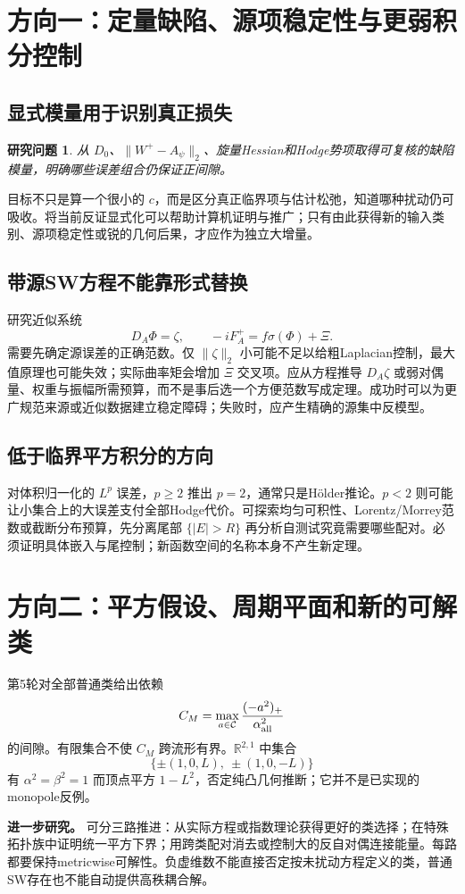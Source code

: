\documentclass[UTF8,fontset=fandol,zihao=-4]{ctexart}
\theoremstyle{research}
\newtheorem{target}[sourceprop]{研究问题}
\newcommand{\R}{\mathbb R}\newcommand{\Z}{\mathbb Z}\newcommand{\CP}{\mathbb{CP}}
\newcommand{\proposal}{\par\noindent\textbf{进一步研究。}}
\begin{document}
\section{方向一：定量缺陷、源项稳定性与更弱积分控制}
\subsection{显式模量用于识别真正损失}
\begin{target}
从 $D_0$、$\|W^+-A_\psi\|_2$、旋量Hessian和Hodge势项取得可复核的缺陷模量，明确哪些误差组合仍保证正间隙。
\end{target}
目标不只是算一个很小的 $c$，而是区分真正临界项与估计松弛，知道哪种扰动仍可吸收。将当前反证显式化可以帮助计算机证明与推广；只有由此获得新的输入类别、源项稳定性或锐的几何后果，才应作为独立大增量。

\subsection{带源SW方程不能靠形式替换}
研究近似系统
\[
 D_A\Phi=\zeta,\qquad -iF_A^+=f\sigma(\Phi)+\Xi.
\]
需要先确定源误差的正确范数。仅 $\|\zeta\|_2$ 小可能不足以给粗Laplacian控制，最大值原理也可能失效；实际曲率矩会增加 $\Xi$ 交叉项。应从方程推导 $D_A\zeta$ 或弱对偶量、权重与振幅所需预算，而不是事后选一个方便范数写成定理。成功时可以为更广规范来源或近似数据建立稳定障碍；失败时，应产生精确的源集中反模型。

\subsection{低于临界平方积分的方向}
对体积归一化的 $L^p$ 误差，$p\ge2$ 推出 $p=2$，通常只是Hölder推论。$p<2$ 则可能让小集合上的大误差支付全部Hodge代价。可探索均匀可积性、Lorentz/Morrey范数或截断分布预算，先分离尾部 $\{|E|>R\}$ 再分析自测试究竟需要哪些配对。必须证明具体嵌入与尾控制；新函数空间的名称本身不产生新定理。

\section{方向二：平方假设、周期平面和新的可解类}
第5轮对全部普通类给出依赖
\[
 C_M=\max_{a\in\mathcal C}\frac{(-a^2)_+}{\alpha_{\rm all}^2}
\]
的间隙。有限集合不使 $C_M$ 跨流形有界。$\R^{2,1}$ 中集合
\[
 \{\pm(1,0,L),\ \pm(1,0,-L)\}
\]
有 $\alpha^2=\beta^2=1$ 而顶点平方 $1-L^2$，否定纯凸几何推断；它并不是已实现的monopole反例。

\proposal
可分三路推进：从实际方程或指数理论获得更好的类选择；在特殊拓扑族中证明统一平方下界；用跨类配对消去或控制大的反自对偶连接能量。每路都要保持metricwise可解性。负虚维数不能直接否定按未扰动方程定义的类，普通SW存在也不能自动提供高秩耦合解。
\end{document}
